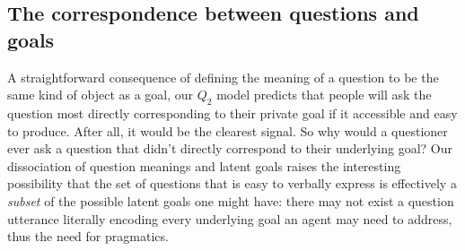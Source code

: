 \documentclass[11pt, floatsintext]{apa6}
\begin{document}

 
\subsection{The correspondence between questions and goals}

A straightforward consequence of defining the meaning of a question to be the same kind of object as a goal, our $Q_2$ model predicts that people will ask the question most directly corresponding to their private goal if it accessible and easy to produce.
After all, it would be the clearest signal.
So why would a questioner ever ask a question that didn't directly correspond to their underlying goal? 
Our dissociation of question meanings and latent goals raises the interesting possibility that the set of questions that is easy to verbally express is effectively a \emph{subset} of the possible latent goals one might have: there may not exist a question utterance literally encoding every underlying goal an agent may need to address, thus the need for pragmatics.
\end{document}
